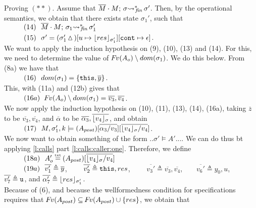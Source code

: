 \begin{description}
 \vspace{.1cm}
Proving $(**)$. Assume that   $\leadstoBoundedStarFin  {\Mtwo\cdot M}  {\sigma}  {\sigma'}$. Then, by the operational semantics, we obtain that 
there exists state $\sigma_1'$, such that \\
$\SPS (14) \ \ \leadstoBoundedStarFin  {\Mtwo\cdot M}  {\sigma_1}  {\sigma_1'}$ \\
$\SPS (15) \ \ \sigma'=(\sigma_1'\popSymbol)[u \mapsto {\interpret {\sigma_1'} {res}}][\prg{cont}\mapsto \epsilon]$.
\\
We want to apply the induction hypothesis on (9), (10), (13) and (14). For this, we need to determine the value of  
$\fv(\Ao
)  \setminus dom(\sigma_1)$.  We do this below. From (8a) we have that\\
$\SPS (16) \ \  dom(\sigma_1)=\{ \prg{this}, \overline y \}$.\\
This, with (11a) and (12b) gives that\\
$\SPS (16a) \ \  \fv(\Ao %
)  \setminus dom(\sigma_1) = \overline {v_3}, \overline {v_4}$.\\
We now apply the induction hypothesis on  (10), (11), (13),   (14),   (16a), taking $\overline z$ to be $\overline {v_3}, \overline {v_4}$, and $\overline \alpha$ to be $\overline {\alpha_3}, \overline{{\interpret {\sigma} {v_4}}}$, and obtain
\\ 
$\SPS (17) \ \  \satDAssertFrom M  {\sigma_1'} {k}   {(A_{post})[\overline{\alpha_3/v_3}][\overline{\interpret {\sigma} {v_4} /v_4}]}$.
\\
We now want to obtain something of the form $..\sigma' \models A' ...$. We can do thus bt applying  \ref{l:calls} part \ref{l:calls:caller:one}. Therefore, we  define
\\
$\SPS (18a) \ \  \Ao' \txteq {(A_{post})[\overline{\interpret {\sigma} {v_4} /v_4}]}$
\\
$\SPS (19a) \ \  \overline {v_1'} \triangleq \overline y$, \ \ \ \ $\overline {v_2'} \triangleq  \prg{this}, res$, \ \ \ \ 
$\overline {v_3'} \triangleq  \overline {v_3},  \overline {v_4} $,\ \ \ \ $\overline {v_6'} \triangleq  y_0, u$, \ \ \ \  
$\overline {v_7'} \triangleq  \prg{u}$, and $\overline {\alpha_7'} \triangleq \interpret {\sigma_1'} {res}$. 
\\
Because of (6), and because the wellformedness condition for specifications requires that $\fv (A_{post}) \subseteq  \fv (A_{post}) \cup \{ res \}$, we obtain that   \\

\end{description}
